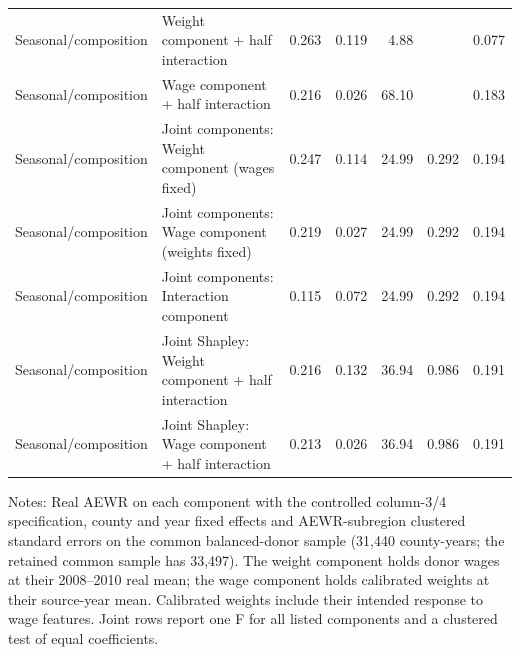 \begin{table}[htbp]
{\begin{tabular}{llrrrrr}
Seasonal/composition & Weight component + half interaction & 0.263 & 0.119 & 4.88 &  & 0.077 \\
Seasonal/composition & Wage component + half interaction & 0.216 & 0.026 & 68.10 &  & 0.183 \\
Seasonal/composition & Joint components: Weight component (wages fixed) & 0.247 & 0.114 & 24.99 & 0.292 & 0.194 \\
Seasonal/composition & Joint components: Wage component (weights fixed) & 0.219 & 0.027 & 24.99 & 0.292 & 0.194 \\
Seasonal/composition & Joint components: Interaction component & 0.115 & 0.072 & 24.99 & 0.292 & 0.194 \\
Seasonal/composition & Joint Shapley: Weight component + half interaction & 0.216 & 0.132 & 36.94 & 0.986 & 0.191 \\
Seasonal/composition & Joint Shapley: Wage component + half interaction & 0.213 & 0.026 & 36.94 & 0.986 & 0.191 \\
\hline\hline
\end{tabular}%
}
\begin{minipage}{0.98\textwidth}\footnotesize Notes: Real AEWR on each component with the controlled column-3/4 specification, county and year fixed effects and AEWR-subregion clustered standard errors on the common balanced-donor sample (31,440 county-years; the retained common sample has 33,497). The weight component holds donor wages at their 2008--2010 real mean; the wage component holds calibrated weights at their source-year mean. Calibrated weights include their intended response to wage features. Joint rows report one F for all listed components and a clustered test of equal coefficients.\end{minipage}
\end{table}
